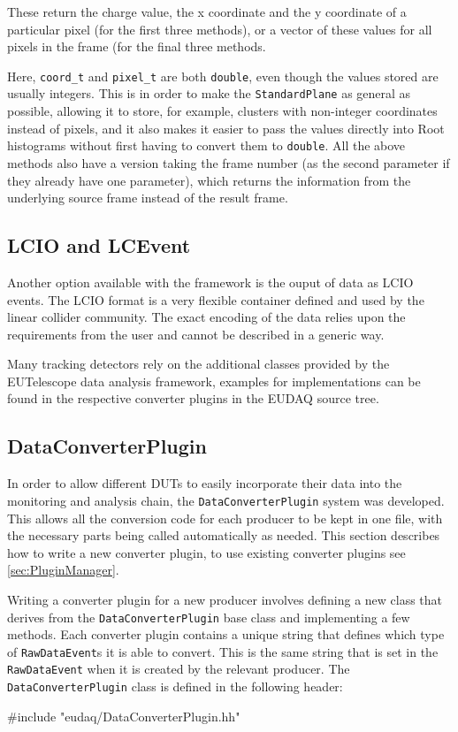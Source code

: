 These return the charge value, the x coordinate and the y coordinate of a particular pixel
(for the first three methods),
or a vector of these values for all pixels in the frame (for the final three methods.

Here, \texttt{coord\_t} and \texttt{pixel\_t} are both \texttt{double}, even though the values stored are usually integers.
This is in order to make the \texttt{StandardPlane} as general as possible, allowing it to store, for example,
clusters with non-integer coordinates instead of pixels, and it also makes it easier to pass the values directly
into Root histograms without first having to convert them to \texttt{double}.
All the above methods also have a version taking the frame number
(as the second parameter if they already have one parameter),
which returns the information from the underlying source frame instead of the result frame.

\subsection{LCIO and LCEvent}\label{sec:LCIO}
Another option available with the framework is the ouput of data as \gls{LCIO} events.
The LCIO format is a very flexible container defined and used by the linear collider community. The exact encoding of the data relies upon the requirements from the user and cannot be described in a generic way.

Many tracking detectors rely on the additional classes provided by the EUTelescope data analysis framework, examples for implementations can be found in the respective converter plugins in the EUDAQ source tree.

\subsection{DataConverterPlugin}
In order to allow different \glspl{DUT} to easily incorporate their data into the monitoring and analysis chain,
the \texttt{DataConverterPlugin} system was developed.
This allows all the conversion code for each producer to be kept in one file,
with the necessary parts being called automatically as needed.
This section describes how to write a new converter plugin,
to use existing converter plugins see \autoref{sec:PluginManager}.

Writing a converter plugin for a new producer involves defining a new class
that derives from the \texttt{DataConverterPlugin} base class and implementing a few methods.
Each converter plugin contains a unique string that defines
which type of \texttt{RawDataEvent}s it is able to convert.
This is the same string that is set in the \texttt{RawDataEvent} when it is created by the relevant producer.
The \texttt{DataConverterPlugin} class is defined in the following header:
\begin{listing}
#include "eudaq/DataConverterPlugin.hh"
\end{listing}

